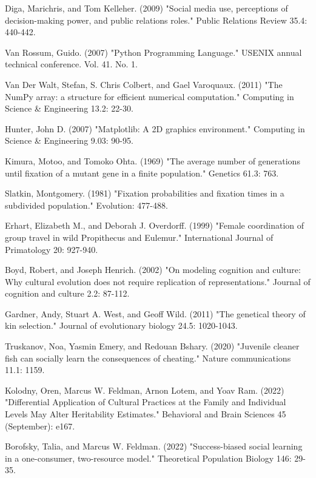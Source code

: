 \documentclass[12pt]{extarticle}
\begin{document}
\begin{thebibliography}{}
Diga, Marichris, and Tom Kelleher. (2009) "Social media use, perceptions of decision-making power, and public relations roles." Public Relations Review 35.4: 440-442.

Van Rossum, Guido. (2007) "Python Programming Language." USENIX annual technical conference. Vol. 41. No. 1.

Van Der Walt, Stefan, S. Chris Colbert, and Gael Varoquaux. (2011) "The NumPy array: a structure for efficient numerical computation." Computing in Science \& Engineering 13.2: 22-30.

Hunter, John D. (2007) "Matplotlib: A 2D graphics environment." Computing in Science \& Engineering 9.03: 90-95.

Kimura, Motoo, and Tomoko Ohta. (1969) "The average number of generations until fixation of a mutant gene in a finite population." Genetics 61.3: 763.

Slatkin, Montgomery. (1981) "Fixation probabilities and fixation times in a subdivided population." Evolution: 477-488.

Erhart, Elizabeth M., and Deborah J. Overdorff. (1999) "Female coordination of group travel in wild Propithecus and Eulemur." International Journal of Primatology 20: 927-940.

Boyd, Robert, and Joseph Henrich. (2002) "On modeling cognition and culture: Why cultural evolution does not require replication of representations." Journal of cognition and culture 2.2: 87-112.

Gardner, Andy, Stuart A. West, and Geoff Wild. (2011) "The genetical theory of kin selection." Journal of evolutionary biology 24.5: 1020-1043.

Truskanov, Noa, Yasmin Emery, and Redouan Bshary. (2020) "Juvenile cleaner fish can socially learn the consequences of cheating." Nature communications 11.1: 1159.

Kolodny, Oren, Marcus W. Feldman, Arnon Lotem, and Yoav Ram. (2022) "Differential Application of Cultural Practices at the Family and Individual Levels May Alter Heritability Estimates." Behavioral and Brain Sciences 45 (September): e167.

Borofsky, Talia, and Marcus W. Feldman. (2022) "Success-biased social learning in a one-consumer, two-resource model." Theoretical Population Biology 146: 29-35.


\end{thebibliography}
\end{document}
